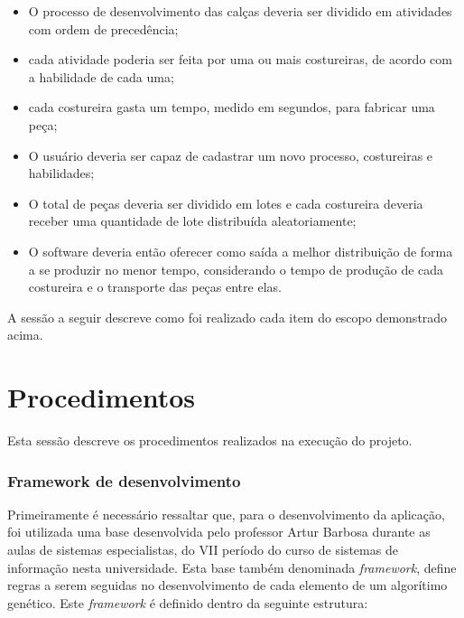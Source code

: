 \begin{itemize}
	
	\item O processo de desenvolvimento das calças deveria ser dividido em atividades com 
	ordem de precedência;
	
	\item cada atividade poderia ser feita por uma ou mais costureiras, de acordo com a habilidade de cada uma;
	
	\item cada costureira gasta um tempo, medido em segundos, para fabricar uma peça;
	
	\item O usuário deveria ser capaz de cadastrar um novo processo, costureiras e habilidades;
	
	\item O total de peças deveria ser dividido em lotes e cada costureira deveria receber uma quantidade de lote
	distribuída aleatoriamente;
	
	\item O software deveria então oferecer como saída a melhor distribuição de forma a se produzir no menor tempo,
	considerando o tempo de produção de cada costureira e o transporte das peças entre elas.
	
\end{itemize}

\par A sessão a seguir descreve como foi realizado cada item do escopo demonstrado acima.



\section{Procedimentos}

\par Esta sessão descreve os procedimentos realizados na execução do projeto.

\subsubsection{Framework de desenvolvimento}
\par Primeiramente é necessário ressaltar que, para o desenvolvimento da aplicação, foi utilizada uma base desenvolvida pelo professor Artur Barbosa durante as aulas de sistemas especialistas, do VII período do curso de sistemas de informação nesta universidade.
Esta base também denominada \textit{framework}, define regras a serem seguidas no desenvolvimento de cada elemento
de um algorítimo genético. Este \textit{framework} é definido dentro da seguinte estrutura:


